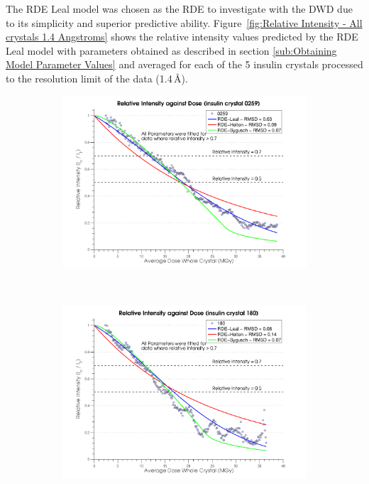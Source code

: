 The RDE Leal model was chosen as the RDE to investigate with the DWD due to its simplicity and superior predictive ability.
Figure~\ref{fig:Relative Intensity - All crystals 1.4 Angstroms} shows the relative intensity values predicted by the RDE Leal model with parameters obtained as described in section \ref{sub:Obtaining Model Parameter Values} and averaged for each of the 5 insulin crystals processed to the resolution limit of the data (1.4\,\AA).
\begin{figure}[H]
    \centering
    \begin{subfigure}[b]{1\textwidth}
        \centering
        \includegraphics[width=\textwidth]{figures/dwd/relintplot0259.pdf}
        \caption{}
        \label{Relative Intensity Plots - 0259}
    \end{subfigure}
			\\
    \begin{subfigure}[b]{1\textwidth}
        \centering
        \includegraphics[width=\textwidth]{figures/dwd/relintplot180.pdf}
        \caption{}
        \label{Relative Intensity Plots - 180}
    \end{subfigure}
\end{figure}
